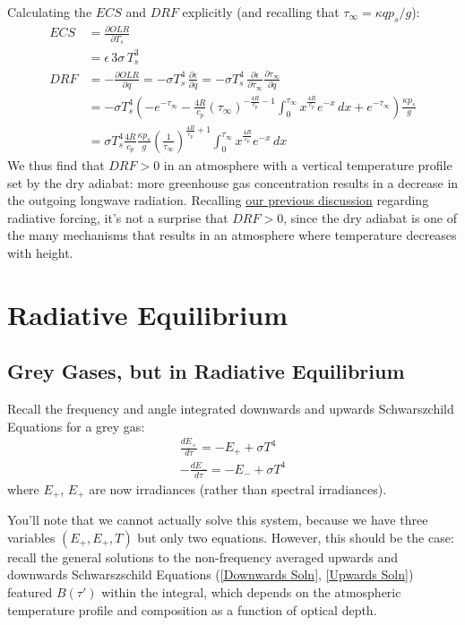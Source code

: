 Calculating the $ECS$ and $DRF$ explicitly (and recalling that $\tau_\infty=\kappa q p_s/g$):
\begin{align*}
    ECS &=\frac{\partial OLR}{\partial T_s}\\
    &=\epsilon\, 3\sigma\, T_s^3
    \\
    DRF &= -\frac{\partial OLR}{\partial q}=-\sigma T_s^4 \,\frac{\partial \epsilon}{\partial q} 
    =-\sigma T_s^4 \,\frac{\partial \epsilon}{\partial \tau_\infty} \frac{\partial \tau_\infty}{\partial q}
    \\
    &= -\sigma T_s^4 \left( -e^{-\tau_\infty} - 
    \frac{4R}{c_p}
    \left( \tau_\infty \right)^{-\frac{4R}{c_p}-1}
    \int_0^{\tau_\infty}
    x^{\frac{4R}{c_p}}
    e^{-x}
    \,dx
    +
    e^{-\tau_\infty}
    \right)
    \frac{\kappa p_s}{g}
    \\
    &=\sigma T_s^4 \frac{4R}{c_p}\frac{\kappa p_s}{g} \left( \frac{1}{\tau_\infty} \right)^{\frac{4R}{c_p}+1}
    \int_0^{\tau_\infty}
    x^{\frac{4R}{c_p}}
    e^{-x}
    \,dx
\end{align*}
We thus find that $DRF>0$ in an atmosphere with a vertical temperature profile set by the dry adiabat: more greenhouse gas concentration results in a decrease in the outgoing longwave radiation. Recalling \hyperref[RF Box Takeaway]{our previous discussion} regarding radiative forcing, it's not a surprise that $DRF>0$, since the dry adiabat is one of the many mechanisms that results in an atmosphere where temperature decreases with height.

\chapter{Radiative Equilibrium}

\section{Grey Gases, but in Radiative Equilibrium}

Recall the frequency and angle integrated downwards and upwards Schwarszchild Equations for a grey gas:
\begin{align*}
    \frac{dE_+}{d\tau}=-E_++\sigma T^4 \\
    -\frac{dE_-}{d\tau}=-E_-+\sigma T^4
\end{align*}
where $E_+$, $E_+$ are now irradiances (rather than spectral irradiances).

You'll note that we cannot actually solve this system, because we have three variables $(E_+,E_+,T)$ but only two equations. However, this should be the case: recall the general solutions to the non-frequency averaged upwards and downwards Schwarszschild Equations (\ref{Downwards Soln}, \ref{Upwards Soln}) featured $B(\tau')$ within the integral, which depends on the atmospheric temperature profile and composition as a function of optical depth. 

